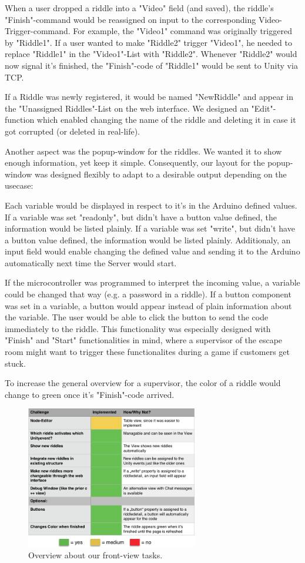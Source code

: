 When a user dropped a riddle into a "Video" field (and saved), the riddle's "Finish"-command would be reassigned on input to the corresponding Video-Trigger-command. 
For example, the "Video1" command was originally triggered by "Riddle1". 
If a user wanted to make "Riddle2" trigger "Video1", he needed to replace "Riddle1" in the "Video1"-List with "Riddle2". 
Whenever "Riddle2" would now signal it's finished, the "Finish"-code of "Riddle1" would be sent to Unity via TCP.

If a Riddle was newly registered, it would be named "NewRiddle" and appear in the "Unassigned Riddles"-List on the web interface.
We designed an "Edit"-function which enabled changing the name of the riddle and deleting it in case it got corrupted (or deleted in real-life).

Another aspect was the popup-window for the riddles. We wanted it to show enough information, yet keep it simple. 
Consequently, our layout for the popup-window was designed flexibly to adapt to a desirable output depending on the usecase:

Each variable would be displayed in respect to it's in the Arduino defined values. 
If a variable was set "readonly", but didn't have a button value defined, the information would be listed plainly.
If a variable was set "write", but didn't have a button value defined, the information would be listed plainly. 
Additionaly, an input field would enable changing the defined value and sending it to the Arduino automatically next time the Server would start. 

If the microcontroller was programmed to interpret the incoming value, a variable could be changed that way (e.g. a password in a riddle).
If a button component was set in a variable, a button would appear instead of plain information about the variable. 
The user would be able to click the button to send the code immediately to the riddle. 
This functionality was especially designed with "Finish" and "Start" functionalities in mind, where a supervisor of the escape room might want to trigger these functionalites during a game if customers get stuck.

To increase the general overview for a supervisor, the color of a riddle would change to green once it's "Finish"-code arrived.

\begin{figure}[th]
	\centering
	\includegraphics[width=75mm,scale=0.75]{Figures/frontendOverview}
	\decoRule
	\caption[FrontViewTable]{Overview about our front-view tasks.}
	\label{fig:FrontViewTable}
\end{figure}



